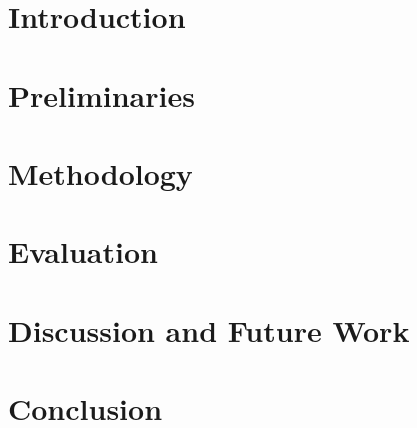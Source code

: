 \documentclass[headsepline,footsepline,footinclude=false,oneside,fontsize=11pt,paper=a4,listof=totoc,bibliography=totoc]{scrbook} %
\begin{document}


\frontmatter{}


% 

\tableofcontents{}

\mainmatter{}
\chapter{Introduction}





\chapter{Preliminaries}




\chapter{Methodology}




\chapter{Evaluation}





\chapter{Discussion and Future Work}
\chapter{Conclusion}

% 
% 
% 
% 
% 

\appendix{}
\listoffigures{}
\listoftables{}
\printbibliography{}
\end{document}
